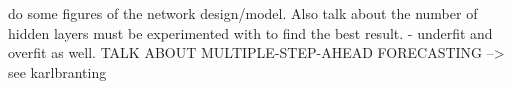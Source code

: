 do some figures of the network design/model. Also talk about the number of hidden layers must be experimented with to find the best result. - underfit and overfit as well.
TALK ABOUT MULTIPLE-STEP-AHEAD FORECASTING --> see karlbranting